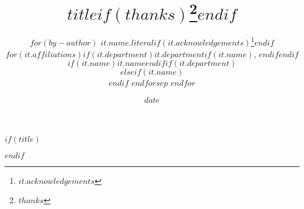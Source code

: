 $if(title)$
\title{$title$$if(thanks)$\thanks{$thanks$}$endif$}
$endif$


\author{
$for(by-author)$
$it.name.literal$$if(it.acknowledgements)$\thanks{$it.acknowledgements$}$endif$\\
$for(it.affiliations)$$if(it.department)$$it.department$$if(it.name)$, $endif$$endif$$if(it.name)$$it.name$$endif$$if(it.department)$\\$elseif(it.name)$\\$endif$
$endfor$$sep$  \bigskip $endfor$}


\date{$date$}
